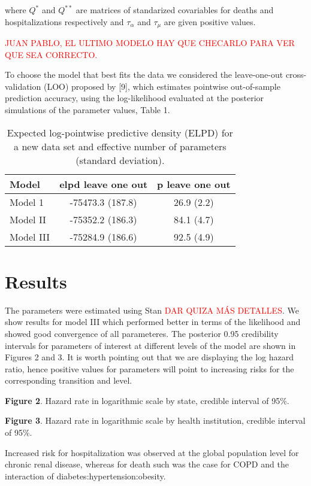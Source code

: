 \documentclass[10pt,letterpaper]{article}
\begin{document}
where \(Q^*\) and \(Q^{**}\) are matrices of standarized covariables for
deaths and hospitalizations respectively and \(\tau_\alpha\) and
\(\tau_{\mu}\) are given positive values.

\textcolor{red}{JUAN PABLO, EL ULTIMO MODELO HAY QUE CHECARLO PARA VER QUE SEA CORRECTO.}

To choose the model that best fits the data we considered the
leave-one-out cross-validation (LOO) proposed by {[}9{]}, which
estimates pointwise out-of-sample prediction accuracy, using the
log-likelihood evaluated at the posterior simulations of the parameter
values, Table 1.

\begin{table}[!htb]
\centering
\begin{tabular}{lcc}
\hline
{\textbf{Model}} & {\textbf{elpd leave one out}} & {\textbf{p leave one out}} \\
\hline Model 1  &  -75473.3 (187.8) & 26.9 (2.2) \\
Model II          &   -75352.2 (186.3) &  84.1 (4.7)\\
Model III         &    -75284.9 (186.6) &  92.5 (4.9)  \\
\hline
\end{tabular}
\caption{\label{tab:gof} Expected log-pointwise predictive density (ELPD) for a new data set and effective number of parameters (standard deviation).}
\end{table}

\section{Results}\label{results}

The parameters were estimated using Stan
\textcolor{red}{DAR QUIZA MÁS DETALLES}. We show results for model III
which performed better in terms of the likelihood and showed good
convergence of all parameteres. The posterior 0.95 credibility intervals
for parameters of interest at different levels of the model are shown in
Figures 2 and 3. It is worth pointing out that we are displaying the log
hazard ratio, hence positive values for parameters will point to
increasing risks for the corresponding transition and level.

\textbf{Figure 2}. Hazard rate in logarithmic scale by state, credible
interval of 95\%.

\textbf{Figure 3}. Hazard rate in logarithmic scale by health
institution, credible interval of 95\%.

Increased risk for hospitalization was observed at the global population
level for chronic renal disease, whereas for death such was the case for
COPD and the interaction of diabetes:hypertension:obesity.
\end{document}
